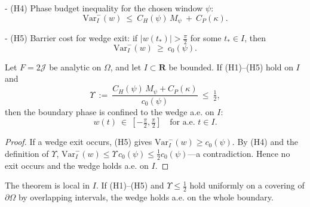 - (H4) Phase budget inequality for the chosen window $\psi$:
\[\mathrm{Var}^{-}_{I}(w)\ \le\ C_H(\psi)\,M_\psi\ +\ C_P(\kappa).\]

- (H5) Barrier cost for wedge exit: if $|w(t_*)|>\tfrac{\pi}{2}$ for some $t_*\in I$, then
\[\mathrm{Var}^{-}_{I}(w)\ \ge\ c_0(\psi).\]

\begin{theorem}\label{thm:phase-certificate}
Let $F=2\mathcal J$ be analytic on $\Omega$, and let $I\subset\mathbf R$ be bounded. If \textup{(H1)}–\textup{(H5)} hold on $I$ and
\[\Upsilon\ :=\ \frac{C_H(\psi)\,M_\psi + C_P(\kappa)}{\,c_0(\psi)\,}\ \le\ \tfrac12,\]
then the boundary phase is confined to the wedge a.e. on $I$:
\[w(t)\ \in\ [-\tfrac{\pi}{2},\tfrac{\pi}{2}]\quad\text{for a.e. }t\in I.\]
\end{theorem}

\begin{proof}
If a wedge exit occurs, (H5) gives $\mathrm{Var}^{-}_{I}(w)\ge c_0(\psi)$. By (H4) and the definition of $\Upsilon$, $\mathrm{Var}^{-}_{I}(w)\le \Upsilon\,c_0(\psi)\le \tfrac12 c_0(\psi)$—a contradiction. Hence no exit occurs and the wedge holds a.e. on $I$.
\end{proof}

\begin{remark}
The theorem is local in $I$. If (H1)–(H5) and $\Upsilon\le \tfrac12$ hold uniformly on a covering of $\partial\Omega$ by overlapping intervals, the wedge holds a.e. on the whole boundary.
\end{remark}
